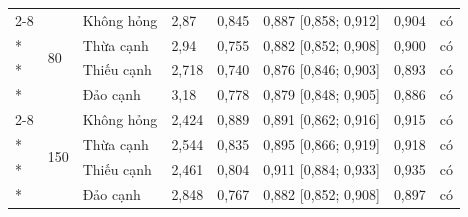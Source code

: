 {\begin{longtable}{llllrrrc}
\cmidrule(l){2-8}
 & \multirow{4}{*}{80} & Không hỏng & 2,87 & 0,845 & 0,887 [0,858; 0,912] & 0,904 & có \\*
 &  & Thừa cạnh & 2,94 & 0,755 & 0,882 [0,852; 0,908] & 0,900 & có \\*
 &  & Thiếu cạnh & 2,718 & 0,740 & 0,876 [0,846; 0,903] & 0,893 & có \\*
 &  & Đảo cạnh & 3,18 & 0,778 & 0,879 [0,848; 0,905] & 0,886 & có \\
\cmidrule(l){2-8}
 & \multirow{4}{*}{150} & Không hỏng & 2,424 & 0,889 & 0,891 [0,862; 0,916] & 0,915 & có \\*
 &  & Thừa cạnh & 2,544 & 0,835 & 0,895 [0,866; 0,919] & 0,918 & có \\*
 &  & Thiếu cạnh & 2,461 & 0,804 & 0,911 [0,884; 0,933] & 0,935 & có \\*
 &  & Đảo cạnh & 2,848 & 0,767 & 0,882 [0,852; 0,908] & 0,897 & có \\
\end{longtable}
}
